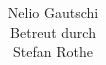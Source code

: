 \documentclass[parskip=full]{scrreprt}
\title{\maTitle \\
\subtitle{\maSubTitle}}
\author{\vspace{1cm}\\Nelio Gautschi\vspace{1cm}\\
Betreut durch \\
Stefan Rothe}
\begin{document}
\maketitle



\tableofcontents
\clearpage

\begingroup
    \let\clearpage\relax
    \listoffigures
    \listoftables
\endgroup









\printbibliography


\end{document}
